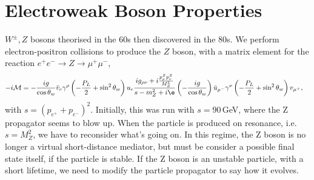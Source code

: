 \documentclass[relqm.tex]{subfiles}
\begin{document}
\chapter{Electroweak Boson Properties}
$W^\pm,Z$ bosons theorised in the 60s then discovered in the 80s. 
We perform electron-positron collisions to produce the $Z$ boson, with a matrix element for the reaction $e^+e^-\to Z\to\mu^+\mu^-$,
\begin{align}
    -i\mathcal{M} &= -\frac{ig}{\cos\theta_w}\bar{v}_e\gamma^\rho\left(-\frac{P_L}{2}+\sin^2\theta_w\right)u_e\frac{ig_{\rho\nu}+i\frac{p_\rho^Zp_\nu^Z}{M_Z^2}}{s-m_Z^2+i\e}\left(-\frac{ig}{\cos\theta_w}\right)\bar{u}_{\mu^-}\gamma^\nu\left(-\frac{P_L}{2}+\sin^2\theta_w\right)v_{\mu^+},
\end{align}
with $s=(p_{e^+}+p_{e^-})^2$.
Initially, this was run with $s=90\,$GeV, where the Z propagator seems to blow up. 
When the particle is produced on resonance, i.e. $s=M_Z^2$, we have to reconsider what's going on. 
In this regime, the Z boson is no longer a virtual short-distance mediator, but must be consider a possible final state itself, if the particle is stable. 
If the Z boson is an unstable particle, with a short lifetime, we need to modify the particle propagator to say how it evolves.
\end{document}
